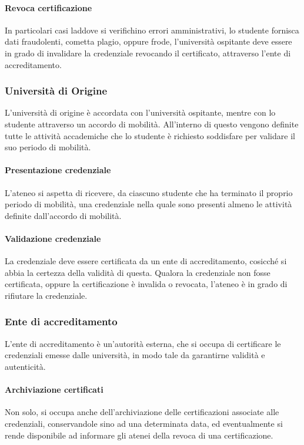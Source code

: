 \documentclass[a4paper,12pt]{article}
\begin{document}
\paragraph{Revoca certificazione} In particolari casi laddove si verifichino errori amministrativi, lo studente fornisca dati fraudolenti, cometta plagio, oppure frode, l'università ospitante deve essere in grado di invalidare la credenziale revocando il certificato, attraverso l'ente di accreditamento.

\subsubsection{Università di Origine}
L'università di origine è accordata con l'università ospitante, mentre con lo studente attraverso un accordo di mobilità. All'interno di questo vengono definite tutte le attività accademiche che lo studente è richiesto soddisfare per validare il suo periodo di mobilità.
\paragraph{Presentazione credenziale} L'ateneo si aspetta di ricevere, da ciascuno studente che ha terminato il proprio periodo di mobilità, una credenziale nella quale sono presenti almeno le attività definite dall'accordo di mobilità.
\paragraph{Validazione credenziale} La credenziale deve essere certificata da un ente di accreditamento, cosicché si abbia la certezza della validità di questa. Qualora la credenziale non fosse certificata, oppure la certificazione è invalida o revocata, l'ateneo è in grado di rifiutare la credenziale.
\subsubsection{Ente di accreditamento}
L'ente di accreditamento è un'autorità esterna, che si occupa di certificare le credenziali emesse dalle università, in modo tale da garantirne validità e autenticità. 
\paragraph{Archiviazione certificati}Non solo, si occupa anche dell'archiviazione delle certificazioni associate alle credenziali, conservandole sino ad una determinata data, ed eventualmente si rende disponibile ad informare gli atenei della revoca di una certificazione.
\end{document}
